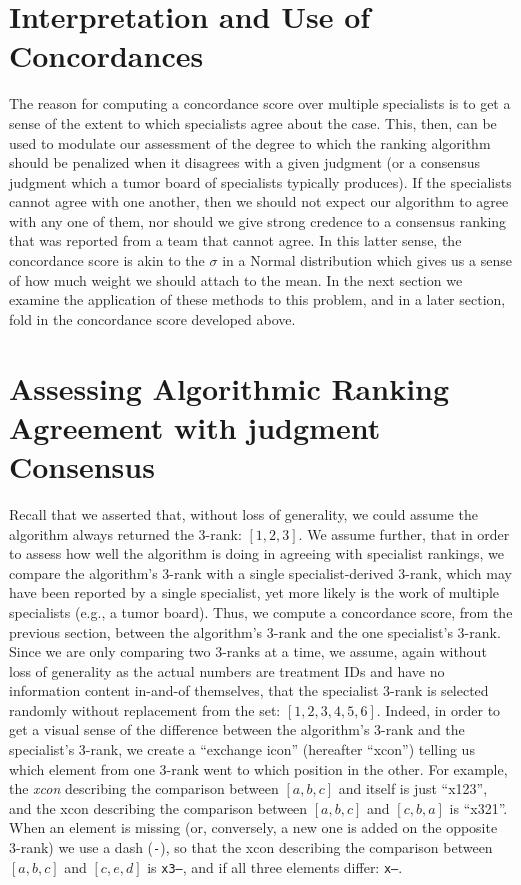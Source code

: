 \documentclass{article}
\begin{document}
\section{Interpretation and Use of Concordances}

The reason for computing a concordance score over multiple specialists is to get a sense of the extent to which specialists agree about the case. This, then, can be used to modulate our assessment of the degree to which the ranking algorithm should be penalized when it disagrees with a given judgment (or a consensus judgment which a tumor board of specialists typically produces). If the specialists cannot agree with one another, then we should not expect our algorithm to agree with any one of them, nor should we give strong credence to a consensus ranking that was reported from a team that cannot agree. In this latter sense, the concordance score is akin to the $\sigma$ in a Normal distribution which gives us a sense of how much weight we should attach to the mean. In the next section we examine the application of these methods to this problem, and in a later section, fold in the concordance score developed above. 

\newpage
\section{Assessing Algorithmic Ranking Agreement with judgment Consensus}

Recall that we asserted that, without loss of generality, we could assume the algorithm always returned the 3-rank: $[1,2,3]$. We assume further, that in order to assess how well the algorithm is doing in agreeing with specialist rankings, we compare the algorithm's 3-rank with a single specialist-derived 3-rank, which may have been reported by a single specialist, yet more likely is the work of multiple specialists (e.g., a tumor board). Thus, we compute a concordance score, from the previous section, between the algorithm's 3-rank and the one specialist's 3-rank. Since we are only comparing two 3-ranks at a time, we assume, again without loss of generality as the actual numbers are treatment IDs and have no information content in-and-of themselves, that the specialist 3-rank is selected randomly without replacement from the set: $[1,2,3,4,5,6]$. Indeed, in order to get a visual sense of the difference between the algorithm's 3-rank and the specialist's 3-rank, we create a ``exchange icon'' (hereafter ``xcon'') telling us which element from one 3-rank went to which position in the other. For example, the \emph{xcon} describing the comparison between $[a,b,c]$ and itself is just ``x123'', and the xcon describing the comparison between $[a,b,c]$ and $[c,b,a]$ is ``x321''. When an element is missing (or, conversely, a new one is added on the opposite 3-rank) we use a dash (\texttt{-}), so that the xcon describing the comparison between $[a,b,c]$ and $[c,e,d]$ is \texttt{x3--}, and if all three elements differ: \texttt{x---}. 
\end{document}
